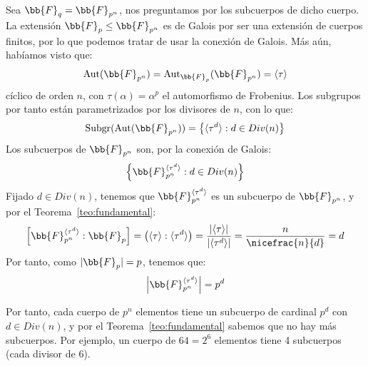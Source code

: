 \begin{ejemplo}
    Sea $\bb{F}_q = \bb{F}_{p^n}$, nos preguntamos por los subcuerpos de dicho cuerpo. La extensión $\bb{F}_p\leq \bb{F}_{p^n}$ es de Galois por ser una extensión de cuerpos finitos, por lo que podemos tratar de usar la conexión de Galois. Más aún, habíamos visto que:
    \begin{equation*}
        \Aut(\bb{F}_{p^n}) = \Aut_{\bb{F}_p}(\bb{F}_{p^n}) = \langle \tau \rangle 
    \end{equation*}
    cíclico de orden $n$, con $\tau(\alpha)=\alpha^p$ el automorfismo de Frobenius. Los subgrupos por tanto están parametrizados por los divisores de $n$, con lo que:
    \begin{equation*}
        \Subgr(\Aut(\bb{F}_{p^n})) = \left\{\langle \tau^d \rangle : d \in Div(n) \right\}
    \end{equation*}
    Los subcuerpos de $\bb{F}_{p^n}$ son, por la conexión de Galois:
    \begin{equation*}
        \left\{\bb{F}_{p^n}^{\langle \tau^d \rangle }: d\in Div(n)\right\}
    \end{equation*}
    Fijado $d\in Div(n)$, tenemos que $\bb{F}_{p^n}^{\langle \tau^d \rangle }$ es un subcuerpo de $\bb{F}_{p^n}$, y por el Teorema~\ref{teo:fundamental}:
    \begin{equation*}
        \left[\bb{F}_{p^n}^{\langle \tau^d \rangle }:\bb{F}_p\right] = \left(\langle \tau \rangle : \langle \tau^d \rangle \right) = \dfrac{|\langle \tau \rangle|}{|\langle \tau^d \rangle|} = \dfrac{n}{\nicefrac{n}{d}} = d
    \end{equation*}
    Por tanto, como $|\bb{F}_p| = p$, tenemos que:
    \begin{equation*}
        \left|\bb{F}_{p^n}^{\langle \tau^d \rangle }\right| = p^d
    \end{equation*}
    
    
    Por tanto, cada cuerpo de $p^n$ elementos tiene un subcuerpo de cardinal $p^d$ con $d\in Div(n)$, y por el Teorema~\ref{teo:fundamental} sabemos que no hay más subcuerpos. Por ejemplo, un cuerpo de $64=2^6$ elementos tiene 4 subcuerpos (cada divisor de 6).
\end{ejemplo}

